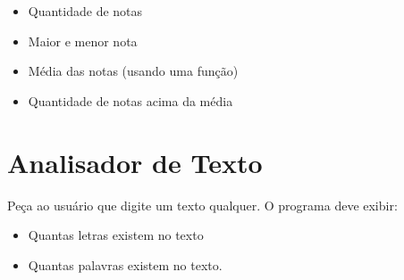 \begin{itemize}
    \item Quantidade de notas

    \item     Maior e menor nota

    \item     Média das notas (usando uma função)

    \item     Quantidade de notas acima da média

\end{itemize}

\section{Analisador de Texto}
Peça ao usuário que digite um texto qualquer.
O programa deve exibir:
\begin{itemize}
\item Quantas letras existem no texto
    
    \item Quantas palavras existem no texto.
\end{itemize}

    

    
